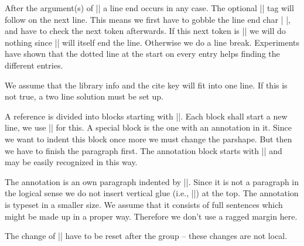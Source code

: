 After the argument(s) of |\bibitem| a line end occurs in any case. The
optional |\library| tag will follow on the next line. This means we
first have to gobble the line end char |^^M|, and have to check the
next token afterwards. If this next token is |\library| we will do
nothing since |\library| will itself end the line. Otherwise we do a
line break. Experiments have shown that the dotted line at the start
on every entry helps finding the different entries.

\beginprog
\def\@lbibitem[#1]{\@bibitem}

\def\@bibitem#1{%
    \item[\tt #1]\leavevmode
    \null \dotfill
    \begingroup
        \obeylines
        \afterassignment\prepare_check_library
	\let\next               %
    }
\def\prepare_check_library{%
        \futurelet\next \check_library
    }
\def\check_library{%
        \ifx \next\library
        \else  \break
        \fi
    \endgroup
    }
\endprog


\sect We assume that the library info and the cite key will fit into
one line. If this is not true, a two line solution must be set up.

\beginprog
\def\library#1#2.{%
    \quad {\sf (#1)}\break
    }
\endprog


\sect A reference is divided into blocks starting with |\newblock|.
Each block shall start a new line, we use |\newline| for this. A
special block is the one with an annotation in it. Since we want to
indent this block once more we must change the parshape. But then we
have to finish the paragraph first. The annotation block starts with
|\annote| and may be easily recognized in this way.

\beginprog
\def\newblock{%
    \futurelet\next \@checkAnnote
    }
\def\@checkAnnote{%
    \ifx \next\annote
    \else  \newline
    \fi
    }
\endprog


\sect The annotation is an own paragraph indented by |\leftmargin|.
Since it is not a paragraph in the logical sense we do not insert
vertical glue (i.e., |\parskip|) at the top. The annotation is typeset
in a smaller size. We assume that it consists of full sentences which
might be made up in a proper way. Therefore we don't use a ragged
margin here.

The change of |\parshape| have to be reset after the group -- these
changes are not local.

